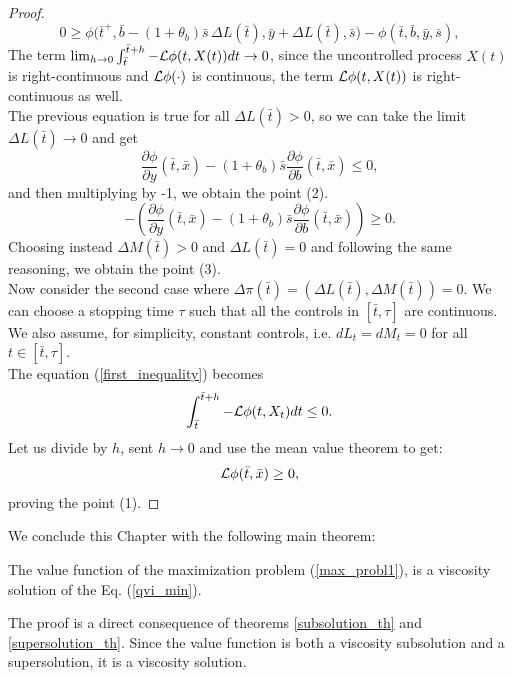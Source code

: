 \begin{proof}
\begin{equation*}
 0 \geq \phi \bigl( \bar t^+, \bar b - (1+\theta_b) \bar s\, \Delta L(\bar t), \bar y + \Delta L(\bar t), \bar s \bigr) - \phi(\bar t, \bar b, \bar y, \bar s),
\end{equation*} 
The term $\lim_{h\to 0} \int_{\bar t}^{\bar t +h} - \mathcal{L} \phi(t,X(t)) dt \to 0$, since the uncontrolled process $X(t)$ is right-continuous and $\mathcal{L} \phi(\cdot)$ is continuous, 
the term $\mathcal{L} \phi(t,X(t))$ is right-continuous as well.\\  
The previous equation is true for all $\Delta L(\bar t)>0$, so we can take the limit $\Delta L(\bar t) \to 0$ and get
\begin{equation*}
 \frac{\partial \phi}{\partial y}(\bar t, \bar x)
 -(1+\theta_b) \bar s \frac{\partial \phi}{\partial b}(\bar t, \bar x) \leq 0,
\end{equation*}
and then multiplying by -1, we obtain the point (2). 
\begin{equation*}
-\left(\frac{\partial \phi}{\partial y}(\bar t, \bar x)
 -(1+\theta_b) \bar s \frac{\partial \phi}{\partial b}(\bar t, \bar x)\right) \geq 0.
\end{equation*}
Choosing instead $\Delta M(\bar t)>0$ and $\Delta L(\bar t)=0$ and following the same reasoning, we obtain the point (3).\\

\noindent
Now consider the second case where $\Delta \pi(\bar t)= (\Delta L(\bar t),\Delta M(\bar t)) =0$.
We can choose a stopping time $\tau$ such that all the controls in $[\bar t, \tau]$ are continuous. We also assume, for simplicity, constant controls, i.e.
$dL_t = dM_t = 0$ for all $t \in [\bar t, \tau]$.\\
The equation (\ref{first_inequality}) becomes 
\begin{equation*}
 \int_{\bar t}^{\bar t +h} - \mathcal{L} \phi(t,X_t) dt \leq 0.
\end{equation*}
Let us divide by $h$, sent $h\to 0$ and use the mean value theorem to get:
\begin{equation*}
 \mathcal{L} \phi(\bar t, \bar x) \geq 0,
\end{equation*}
proving the point (1).
\end{proof}


\noindent
We conclude this Chapter with the following main theorem:
\begin{Theorem}
 The value function of the maximization problem (\ref{max_probl1}), is a viscosity solution of the Eq. (\ref{qvi_min}).
\end{Theorem}
The proof is a direct consequence of theorems \ref{subsolution_th} and \ref{supersolution_th}. Since the value function is both a viscosity 
subsolution and a supersolution, it is a viscosity solution.


